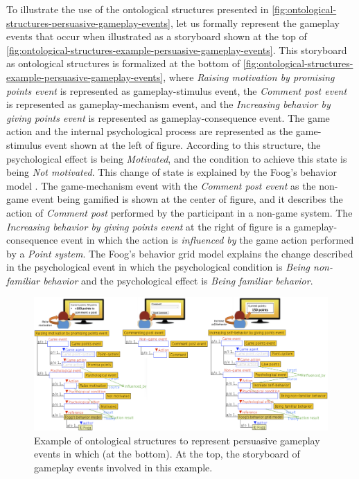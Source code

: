 To illustrate the use of the ontological structures presented in \autoref{fig:ontological-structures-persuasive-gameplay-events}, let us formally represent the gameplay events that occur when  illustrated as a storyboard shown at the top of \autoref{fig:ontological-structures-example-persuasive-gameplay-events}.
This storyboard as ontological structures is formalized at the bottom of \autoref{fig:ontological-structures-example-persuasive-gameplay-events}, where \emph{Raising motivation by promising points event} is represented as gameplay-stimulus event, the \emph{Comment post event} is represented as gameplay-mechanism event, and the \emph{Increasing behavior by giving points event} is represented as gameplay-consequence event.
The game action  and the internal psychological process  are represented as the game-stimulus event  shown at the left of figure.
According to this structure, the psychological effect is being \emph{Motivated}, and the condition to achieve this state is being \emph{Not motivated}. This change of state is explained by the Foog's behavior model \cite{Fogg2009}.
The game-mechanism event with the \emph{Comment post event} as the non-game event being gamified is shown at the center of figure, and it describes the action of \emph{Comment post} performed by the participant in a non-game system.
The \emph{Increasing behavior by giving points event} at the right of figure is a gameplay-consequence event in which the action  is \emph{influenced by} the game action  performed by a \emph{Point system}.
The Foog's behavior grid model explains the change described in the psychological event in which the psychological condition is \emph{Being non-familiar behavior} and the psychological effect is \emph{Being familiar behavior}.

\begin{figure}[!htb]
 \caption[Example of ontological structures to represent persuasive gameplay events]{Example of ontological structures to represent persuasive gameplay events in which   (at the bottom). At the top, the storyboard of gameplay events involved in this example.}
 \label{fig:ontological-structures-example-persuasive-gameplay-events}
 \centering
 \includegraphics[width=1\textwidth]{images/chap-ontogacles2/ontological-structures-example-persuasive-gameplay-events.png}
 \fautor
\end{figure}

